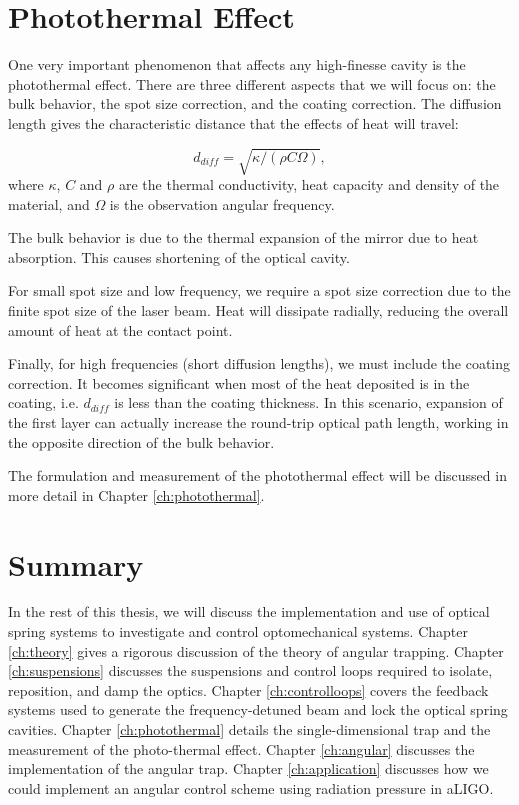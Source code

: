 \section{Photothermal Effect}

One very important phenomenon that affects any high-finesse cavity is the photothermal effect. There are three different aspects that we will focus on: the bulk behavior, the spot size correction, and the coating correction. The diffusion length gives the characteristic distance that the effects of heat will travel:

\begin{equation}
d_{diff}=\sqrt{\kappa/(\rho C \Omega)},
\label{eq:introddiff}
\end{equation}
where $\kappa$, $C$ and $\rho$ are the thermal conductivity, heat capacity and density of the material, and $\Omega$ is the observation angular frequency.

The bulk behavior is due to the thermal expansion of the mirror due to heat absorption. This causes shortening of the optical cavity.

For small spot size and low frequency, we require a spot size correction due to the finite spot size of the laser beam. Heat will dissipate radially, reducing the overall amount of heat at the contact point.  

Finally, for high frequencies (short diffusion lengths), we must include the coating correction. It becomes significant when most of the heat deposited is in the coating, i.e. $d_{diff}$ is less than the coating thickness. In this scenario, expansion of the first layer can actually increase the round-trip optical path length, working in the opposite direction of the bulk behavior. 

The formulation and measurement of the photothermal effect will be discussed in more detail in Chapter \ref{ch:photothermal}.

\section{Summary}
In the rest of this thesis, we will discuss the implementation and use of optical spring systems to investigate and control optomechanical systems. Chapter \ref{ch:theory} gives a rigorous discussion of the theory of angular trapping. Chapter \ref{ch:suspensions} discusses the suspensions and control loops required to isolate, reposition, and damp the optics. Chapter \ref{ch:controlloops} covers the feedback systems used to generate the frequency-detuned beam and lock the optical spring cavities. Chapter \ref{ch:photothermal} details the single-dimensional trap and the measurement of the photo-thermal effect. Chapter \ref{ch:angular} discusses the implementation of the angular trap. Chapter \ref{ch:application} discusses how we could implement an angular control scheme using radiation pressure in aLIGO.